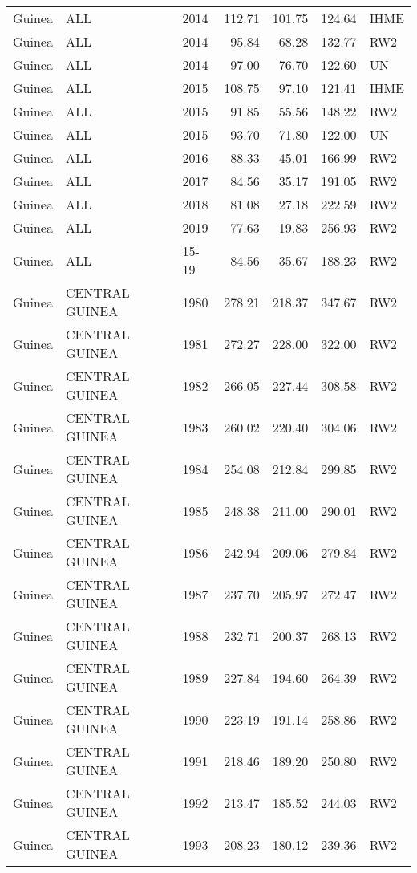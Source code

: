 \begin{longtable}{lllrrrl}
  Guinea & ALL & 2014 & 112.71 & 101.75 & 124.64 & IHME \\ 
  Guinea & ALL & 2014 & 95.84 & 68.28 & 132.77 & RW2 \\ 
  Guinea & ALL & 2014 & 97.00 & 76.70 & 122.60 & UN \\ 
  Guinea & ALL & 2015 & 108.75 & 97.10 & 121.41 & IHME \\ 
  Guinea & ALL & 2015 & 91.85 & 55.56 & 148.22 & RW2 \\ 
  Guinea & ALL & 2015 & 93.70 & 71.80 & 122.00 & UN \\ 
  Guinea & ALL & 2016 & 88.33 & 45.01 & 166.99 & RW2 \\ 
  Guinea & ALL & 2017 & 84.56 & 35.17 & 191.05 & RW2 \\ 
  Guinea & ALL & 2018 & 81.08 & 27.18 & 222.59 & RW2 \\ 
  Guinea & ALL & 2019 & 77.63 & 19.83 & 256.93 & RW2 \\ 
  Guinea & ALL & 15-19 & 84.56 & 35.67 & 188.23 & RW2 \\ 
  Guinea & CENTRAL GUINEA & 1980 & 278.21 & 218.37 & 347.67 & RW2 \\ 
  Guinea & CENTRAL GUINEA & 1981 & 272.27 & 228.00 & 322.00 & RW2 \\ 
  Guinea & CENTRAL GUINEA & 1982 & 266.05 & 227.44 & 308.58 & RW2 \\ 
  Guinea & CENTRAL GUINEA & 1983 & 260.02 & 220.40 & 304.06 & RW2 \\ 
  Guinea & CENTRAL GUINEA & 1984 & 254.08 & 212.84 & 299.85 & RW2 \\ 
  Guinea & CENTRAL GUINEA & 1985 & 248.38 & 211.00 & 290.01 & RW2 \\ 
  Guinea & CENTRAL GUINEA & 1986 & 242.94 & 209.06 & 279.84 & RW2 \\ 
  Guinea & CENTRAL GUINEA & 1987 & 237.70 & 205.97 & 272.47 & RW2 \\ 
  Guinea & CENTRAL GUINEA & 1988 & 232.71 & 200.37 & 268.13 & RW2 \\ 
  Guinea & CENTRAL GUINEA & 1989 & 227.84 & 194.60 & 264.39 & RW2 \\ 
  Guinea & CENTRAL GUINEA & 1990 & 223.19 & 191.14 & 258.86 & RW2 \\ 
  Guinea & CENTRAL GUINEA & 1991 & 218.46 & 189.20 & 250.80 & RW2 \\ 
  Guinea & CENTRAL GUINEA & 1992 & 213.47 & 185.52 & 244.03 & RW2 \\ 
  Guinea & CENTRAL GUINEA & 1993 & 208.23 & 180.12 & 239.36 & RW2 \\ 

\end{longtable}
